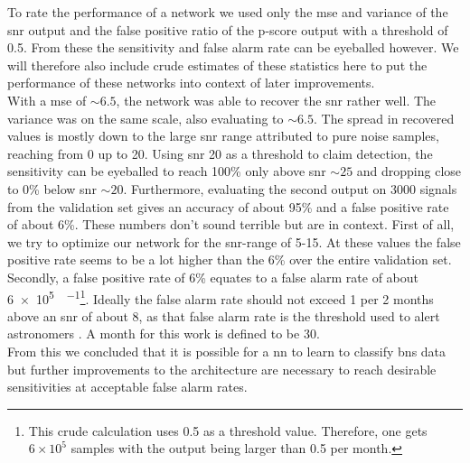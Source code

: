 To rate the performance of a network we used only the \gls{mse} and variance of the \gls{snr} output and the false positive ratio of the p-score output with a threshold of 0.5. From these the sensitivity and false alarm rate can be eyeballed however. We will therefore also include crude estimates of these statistics here to put the performance of these networks into context of later improvements.\\
With a \gls{mse} of $\sim 6.5$, the network was able to recover the \gls{snr} rather well. The variance was on the same scale, also evaluating to $\sim 6.5$. The spread in recovered values is mostly down to the large \gls{snr} range attributed to pure noise samples, reaching from 0 up to 20. Using \gls{snr} 20 as a threshold to claim detection, the sensitivity can be eyeballed to reach 100\% only above \gls{snr} $\sim 25$ and dropping close to 0\% below \gls{snr} $\sim 20$. Furthermore, evaluating the second output on 3000 signals from the validation set gives an accuracy of about 95\% and a false positive rate of about 6\%. These numbers don't sound terrible but are in context. First of all, we try to optimize our network for the \gls{snr}-range of 5-15. At these values the false positive rate seems to be a lot higher than the 6\% over the entire validation set. Secondly, a false positive rate of 6\% equates to a false alarm rate of about \SI[per-mode=fraction]{6e5}{\samples\per\month}\footnote{This crude calculation uses 0.5 as a threshold value. Therefore, one gets $6\times 10^5$ samples with the output being larger than 0.5 per month.}. Ideally the false alarm rate should not exceed 1 per 2 months above an \gls{snr} of about $8$, as that false alarm rate is the threshold used to alert astronomers \cite{pycbc_live}. A month for this work is defined to be \SI{30}{\days}.\\
From this we concluded that it is possible for a \gls{nn} to learn to classify \gls{bns} data but further improvements to the architecture are necessary to reach desirable sensitivities at acceptable false alarm rates.
